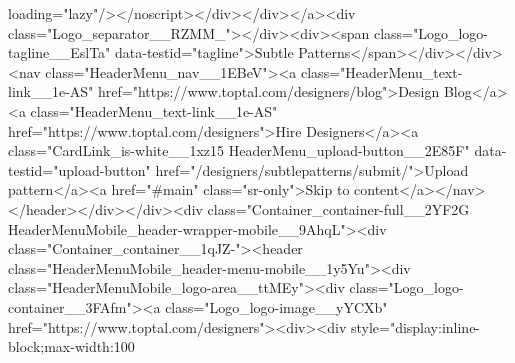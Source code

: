 loading="lazy"/></noscript></div></div></a><div class="Logo_separator__RZMM_"></div><div><span class="Logo_logo-tagline__EslTa" data-testid="tagline">Subtle Patterns</span></div></div><nav class="HeaderMenu_nav__1EBeV"><a class="HeaderMenu_text-link__1e-AS" href="https://www.toptal.com/designers/blog">Design Blog</a><a class="HeaderMenu_text-link__1e-AS" href="https://www.toptal.com/designers">Hire Designers</a><a class="CardLink_is-white__1xz15 HeaderMenu_upload-button__2E85F" data-testid="upload-button" href="/designers/subtlepatterns/submit/">Upload pattern</a><a href="#main" class="sr-only">Skip to content</a></nav></header></div></div><div class="Container_container-full__2YF2G HeaderMenuMobile_header-wrapper-mobile__9AhqL"><div class="Container_container__1qJZ-"><header class="HeaderMenuMobile_header-menu-mobile__1y5Yu"><div class="HeaderMenuMobile_logo-area__ttMEy"><div class="Logo_logo-container__3FAfm"><a class="Logo_logo-image__yYCXb" href="https://www.toptal.com/designers"><div><div style="display:inline-block;max-width:100%